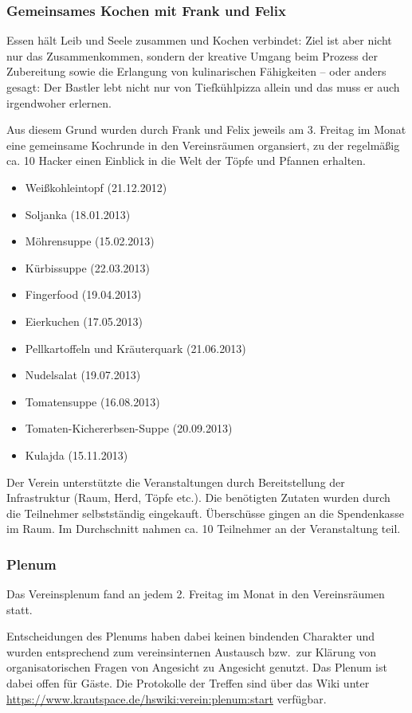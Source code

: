 \documentclass[10pt,DIV16]{scrartcl}
\begin{document}
\subsubsection{Gemeinsames Kochen mit Frank und Felix}

Essen hält Leib und Seele zusammen und Kochen verbindet:
Ziel ist aber nicht nur das Zusammenkommen, sondern der kreative Umgang
beim Prozess der Zubereitung sowie die Erlangung von kulinarischen
Fähigkeiten -- oder anders gesagt: Der Bastler lebt nicht nur von
Tiefkühlpizza allein und das muss er auch irgendwoher erlernen.

Aus diesem Grund wurden durch Frank und Felix jeweils am 3. Freitag
im Monat eine gemeinsame Kochrunde in den Vereinsräumen organsiert,
zu der regelmäßig ca. 10 Hacker einen Einblick in die Welt der Töpfe
und Pfannen erhalten.

\begin{itemize}
	\item Weißkohleintopf (21.12.2012)
	\item Soljanka (18.01.2013)
	\item Möhrensuppe (15.02.2013)
	\item Kürbissuppe (22.03.2013)
	\item Fingerfood (19.04.2013)
	\item Eierkuchen (17.05.2013)
	\item Pellkartoffeln und Kräuterquark (21.06.2013)
	\item Nudelsalat (19.07.2013)
	\item Tomatensuppe (16.08.2013)
	\item Tomaten-Kichererbsen-Suppe (20.09.2013)
	\item Kulajda (15.11.2013)
\end{itemize}

Der Verein unterstützte die Veranstaltungen durch Bereitstellung der
Infrastruktur (Raum, Herd, Töpfe etc.). Die benötigten Zutaten wurden
durch die Teilnehmer selbstständig eingekauft. Überschüsse gingen an
die Spendenkasse im Raum. Im Durchschnitt nahmen ca. 10 Teilnehmer an
der Veranstaltung teil.

\subsubsection{Plenum}

Das Vereinsplenum fand an jedem 2. Freitag im Monat in den
Vereinsräumen statt.

Entscheidungen des Plenums haben dabei keinen bindenden Charakter und
wurden entsprechend zum vereinsinternen Austausch bzw.\ zur Klärung von
organisatorischen Fragen von Angesicht zu Angesicht genutzt. Das Plenum ist dabei offen für Gäste.
Die Protokolle der Treffen sind über das Wiki unter
\url{https://www.krautspace.de/hswiki:verein:plenum:start} verfügbar.
\end{document}
